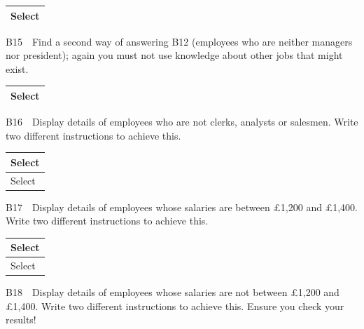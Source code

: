 \begin{flushleft}
\tablefirsthead{}
\tablehead{}
\tabletail{}
\tablelasttail{}
\begin{supertabular}{|m{12.782001cm}|}
\hline
Select 

\\\hline
\end{supertabular}
\end{flushleft}
B15\ \ Find a second way of answering B12 (employees who are neither managers nor president); again you must not use knowledge about other jobs that might exist. 

\begin{flushleft}
\tablefirsthead{}
\tablehead{}
\tabletail{}
\tablelasttail{}
\begin{supertabular}{|m{14.368cm}|}
\hline
Select 

\\\hline
\end{supertabular}
\end{flushleft}
B16\ \ Display details of employees who are not clerks, analysts or salesmen.  Write two different instructions to achieve this.

\begin{flushleft}
\tablefirsthead{}
\tablehead{}
\tabletail{}
\tablelasttail{}
\begin{supertabular}{|m{14.303cm}|}
\hline
Select 

\\\hline
Select 

\\\hline
\end{supertabular}
\end{flushleft}
B17\ \ Display details of employees whose salaries are between £1,200 and £1,400.  Write two different instructions to achieve this.

\begin{flushleft}
\tablefirsthead{}
\tablehead{}
\tabletail{}
\tablelasttail{}
\begin{supertabular}{|m{14.303cm}|}
\hline
Select 

\\\hline
Select 

\\\hline
\end{supertabular}
\end{flushleft}
B18\ \ Display details of employees whose salaries are not between £1,200 and £1,400.  Write two different instructions to achieve this.  Ensure you check your results!

